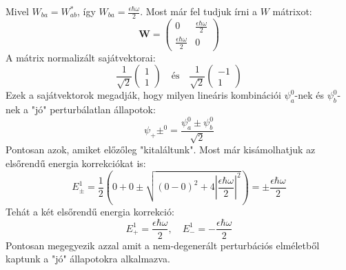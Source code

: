 \documentclass[../main.tex]{subfiles}
\begin{document}
Mivel $W_{ba} = W_{ab}^*$, így $W_{ba} = \frac{\epsilon \hbar \omega}{2}$. Most már fel tudjuk írni a $W$ mátrixot:
\begin{equation}
    \mathbf{W} = \begin{pmatrix}
        0 & \frac{\epsilon \hbar \omega}{2} \\
        \frac{\epsilon \hbar \omega}{2} & 0
    \end{pmatrix}
\end{equation}
A mátrix normalizált sajátvektorai:
\begin{equation}
    \frac{1}{\sqrt{2}} \begin{pmatrix}
        1 \\
        1
    \end{pmatrix} \quad \text{és} \quad \frac{1}{\sqrt{2}} \begin{pmatrix}
        -1 \\
        1
    \end{pmatrix}
\end{equation}
Ezek a sajátvektorok megadják, hogy milyen lineáris kombinációi $\psi_a^0$-nek és $\psi_b^0$-nek a "jó" perturbálatlan állapotok:
\begin{equation}
    \psi_+\pm^0 = \frac{\psi_a^0 \pm \psi_b^0}{\sqrt{2}}
\end{equation}
Pontosan azok, amiket előzőleg "kitaláltunk". Most már kisámolhatjuk az elsőrendű energia korrekciókat is:
\begin{equation}
    E_\pm^1 = \frac{1}{2} \left( 0 + 0 \pm \sqrt{(0 - 0)^2 + 4 \left|\frac{\epsilon \hbar \omega}{2}\right|^2} \right) = \pm \frac{\epsilon \hbar \omega}{2}
\end{equation}
Tehát a két elsőrendű energia korrekció:
\begin{equation}
    E_+^1 = \frac{\epsilon \hbar \omega}{2}, \quad E_-^1 = -\frac{\epsilon \hbar \omega}{2}
\end{equation}
Pontosan megegyezik azzal amit a nem-degenerált perturbációs elméletből kaptunk a "jó" állapotokra alkalmazva.
\end{document}
